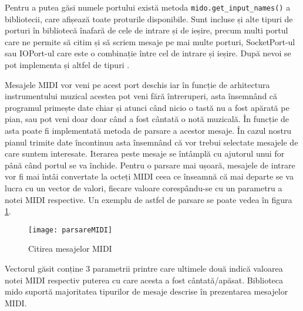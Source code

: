 \documentclass[../IoMusT.tex]{subfiles}
\begin{document}
 Pentru a putea găsi numele portului există metoda \verb|mido.get_input_names()| a bibliotecii, care afișează toate proturile disponibile. Sunt incluse și alte tipuri de porturi în bibliotecă înafară de cele de intrare și de ieșire, precum multi portul care ne permite să citim și să scriem mesaje pe mai multe porturi, SocketPort-ul sau IOPort-ul care este o combinație între cel de intrare și ieșire. După nevoi se pot implementa și altfel de tipuri \cite{Mido}.
\\
\par Mesajele MIDI vor veni pe acest port deschis iar în funcție de arhitectura instrumentului muzical acestea pot veni fără întreruperi, asta însemnând că programul primește date chiar și atunci când nicio o tastă nu a fost apărată pe pian, sau pot veni doar doar când a fost cântată o notă muzicală. În funcție de asta poate fi implementată metoda de parsare a acestor mesaje. În cazul nostru pianul trimite date încontinuu asta însemnând că vor trebui selectate mesajele de care suntem interesate. Iterarea peste mesaje se întâmplă cu ajutorul unui for până când portul se va închide. Pentru o parsare mai ușoară, mesajele de intrare vor fi mai întâi convertate la octeți MIDI ceea ce înseamnă că mai departe se va lucra cu un vector de valori, fiecare valoare corespându-se cu un parametru a notei MIDI respective. Un exemplu de astfel de parsare se poate vedea în figura \ref{fig:midiPars}. 
\begin{figure}[h]
\centering
\texttt{[image: parsareMIDI]}
\caption{Citirea mesajelor MIDI}
\label{fig:midiPars}
\end{figure}
Vectorul găsit conține 3 parametrii printre care ultimele două indică valoarea notei MIDI respectiv puterea cu care acesta a fost cântată/apăsat. Biblioteca mido suportă majoritatea tipurilor de mesaje descrise în prezentarea mesajelor MIDI. 
\end{document}
